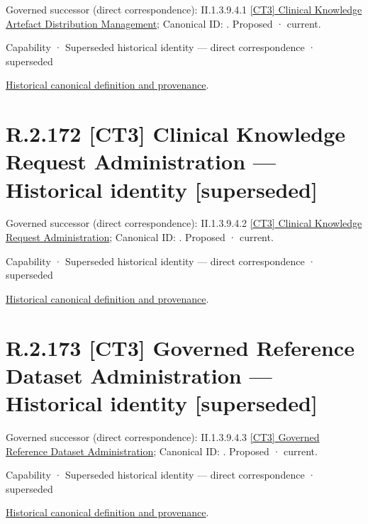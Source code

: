 {\small Governed successor (direct correspondence): II.1.3.9.4.1 \hyperref[element:cd29a9eb798949bc8bc81bb5d434cabf]{[CT3] Clinical Knowledge Artefact Distribution Management}; Canonical ID: \texttt{}. Proposed · current.}\par
\label{element:d81e0d6d76014066a682e3d9e03e5f8a}
{\small Capability · Superseded historical identity — direct correspondence · superseded}\par
\href{../../../../../../../continuum/strategy/capability/d81e0d6d76014066a682e3d9e03e5f8a.md}{Historical canonical definition and provenance}.\par
\section*{R.2.172 [CT3] Clinical Knowledge Request Administration — Historical identity [superseded]}
\label{navigation:R.2.172}

{\small Governed successor (direct correspondence): II.1.3.9.4.2 \hyperref[element:543c53483a2249d78044c6635b7b7c48]{[CT3] Clinical Knowledge Request Administration}; Canonical ID: \texttt{}. Proposed · current.}\par
\label{element:eb370c01fbdb4d22956d97e9ecd74b57}
{\small Capability · Superseded historical identity — direct correspondence · superseded}\par
\href{../../../../../../../continuum/strategy/capability/eb370c01fbdb4d22956d97e9ecd74b57.md}{Historical canonical definition and provenance}.\par
\section*{R.2.173 [CT3] Governed Reference Dataset Administration — Historical identity [superseded]}
\label{navigation:R.2.173}

{\small Governed successor (direct correspondence): II.1.3.9.4.3 \hyperref[element:682b8684ad9e49d5a5c348a148081607]{[CT3] Governed Reference Dataset Administration}; Canonical ID: \texttt{}. Proposed · current.}\par
\label{element:15d972931ed6447797c30a5ddb71737e}
{\small Capability · Superseded historical identity — direct correspondence · superseded}\par
\href{../../../../../../../continuum/strategy/capability/15d972931ed6447797c30a5ddb71737e.md}{Historical canonical definition and provenance}.\par
